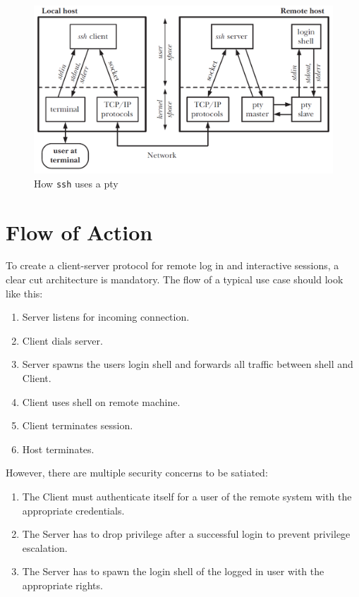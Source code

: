 \documentclass[10pt,a4paper,titlepage,twoside,english,final]{zhawreprt}
\begin{document}
\begin{figure}[ht]
\includegraphics[width=\textwidth]{PseudoterminalSSH}
\caption{How \texttt{ssh} uses a \gls{pty}\citep[p.1378]{KerriskTLPI}}
\label{fig:HowSSHUsesPty}
\end{figure}

\newpage
\section{Flow of Action}\label{sec:FlowOfAction}
To create a client-server protocol for remote log in and interactive sessions, a clear cut architecture is mandatory. The flow of a typical use case should look like this:

\begin{enumerate}
\item Server listens for incoming connection.
\item Client dials server.
\item Server spawns the users login \gls{shell} and forwards all traffic between \gls{shell} and Client.
\item Client uses \gls{shell} on remote machine.
\item Client terminates session.
\item Host terminates.
\end{enumerate}

However, there are multiple security concerns to be satiated:

\begin{enumerate}
\item The Client must authenticate itself for a user of the remote system with the appropriate credentials.
\item The Server has to drop privilege after a successful login to prevent privilege escalation.
\item The Server has to spawn the login \gls{shell} of the logged in user with the appropriate rights.
\end{enumerate}
\end{document}
